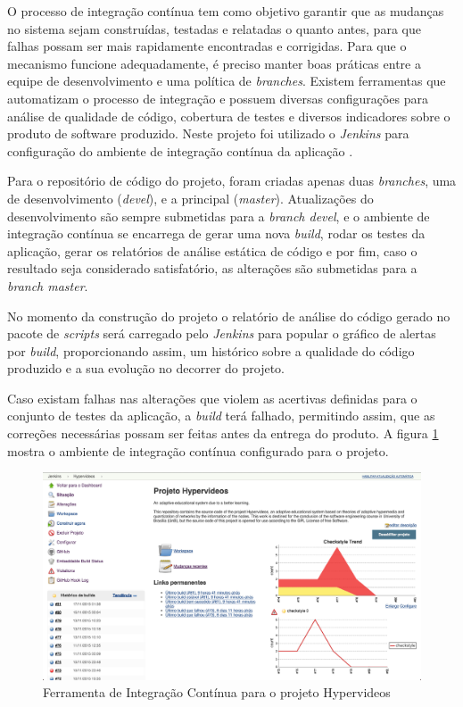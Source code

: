 O processo de integração contínua tem como objetivo garantir que as mudanças no sistema sejam construídas, testadas e relatadas o quanto antes, para que falhas possam ser mais rapidamente encontradas e corrigidas. Para que o mecanismo funcione adequadamente, é preciso manter boas práticas entre a equipe de desenvolvimento e uma política de \textit{branches}. Existem ferramentas que automatizam o processo de integração e possuem diversas configurações para análise de qualidade de código, cobertura de testes e diversos indicadores sobre o produto de software produzido. Neste projeto foi utilizado o \textit{Jenkins} para configuração do ambiente de integração contínua da aplicação \cite{jenkins2015}.

Para o repositório de código do projeto, foram criadas apenas duas \textit{branches}, uma de desenvolvimento (\textit{devel}), e a principal (\textit{master}). Atualizações do desenvolvimento são sempre submetidas para a \textit{branch devel}, e o ambiente de integração contínua se encarrega de gerar uma nova \textit{build}, rodar os testes da aplicação, gerar os relatórios de análise estática de código e por fim, caso o resultado seja considerado satisfatório, as alterações são submetidas para a \textit{branch master}. 

No momento da construção do projeto o relatório de análise do código gerado no pacote de \textit{scripts} será carregado pelo \textit{Jenkins} para popular o gráfico de alertas por \textit{build}, proporcionando assim, um histórico sobre a qualidade do código produzido e a sua evolução no decorrer do projeto.

Caso existam falhas nas alterações que violem as acertivas definidas para o conjunto de testes da aplicação, a \textit{build} terá falhado, permitindo assim, que as correções necessárias possam ser feitas antes da entrega do produto. A figura \ref{fig:jenkins} mostra o ambiente de integração contínua configurado para o projeto.

\begin{figure}[h!]
  	\centering
  	\includegraphics[width=.8\linewidth]{figuras/jenkins.eps}
  	\caption{Ferramenta de Integração Contínua para o projeto Hypervideos}
  	\label{fig:jenkins}
\end{figure}


